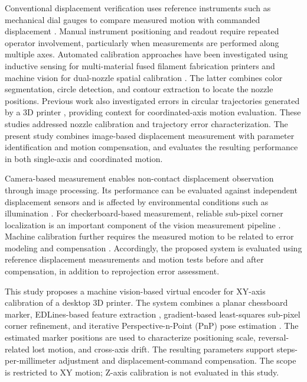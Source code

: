\documentclass[journal]{IEEEtran}
\begin{document}
Conventional displacement verification uses reference
instruments such as mechanical dial gauges to compare
measured motion with commanded displacement
\cite{iso230_1_2012}.
Manual instrument positioning and readout require
repeated operator involvement, particularly when
measurements are performed along multiple axes.
Automated calibration approaches have been investigated
using inductive sensing for multi-material
fused filament fabrication printers
\cite{Schouten2022} and machine vision for
dual-nozzle spatial calibration \cite{Chen2025}.
The latter combines color segmentation, circle
detection, and contour extraction to locate
the nozzle positions.
Previous work also investigated errors in circular
trajectories generated by a 3D printer
\cite{Munteanu2021}, providing context for
coordinated-axis motion evaluation.
These studies addressed nozzle calibration and
trajectory error characterization.
The present study combines image-based displacement
measurement with parameter identification and
motion compensation, and evaluates the resulting
performance in both single-axis and coordinated motion.

Camera-based measurement enables non-contact
displacement observation through image processing.
Its performance can be evaluated against independent
displacement sensors and is affected by environmental
conditions such as illumination \cite{visionbased2016}.
For checkerboard-based measurement, reliable sub-pixel
corner localization is an important component of
the vision measurement pipeline \cite{subpixel2024}.
Machine calibration further requires the measured
motion to be related to error modeling and
compensation \cite{machinetool2023}.
Accordingly, the proposed system is evaluated using
reference displacement measurements and motion tests
before and after compensation, in addition to
reprojection error assessment.

This study proposes a machine vision-based virtual
encoder for XY-axis calibration of a desktop 3D
printer. The system combines a planar chessboard
marker, EDLines-based feature extraction
\cite{Dan2022}, gradient-based least-squares
sub-pixel corner refinement, and iterative
Perspective-n-Point (PnP) pose estimation
\cite{opencv_solvepnp}.
The estimated marker positions are used to
characterize positioning scale, reversal-related
lost motion, and cross-axis drift.
The resulting parameters support steps-per-millimeter
adjustment and displacement-command compensation.
The scope is restricted to XY motion; Z-axis
calibration is not evaluated in this study.
\end{document}
